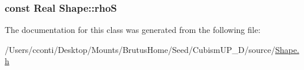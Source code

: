 \subsubsection[{rho\+S}]{\setlength{\rightskip}{0pt plus 5cm}const {\bf Real} Shape\+::rho\+S\hspace{0.3cm}{\ttfamily [protected]}}\label{class_shape_a181acdc3063f20a15ba1807f7b6a5d10}


The documentation for this class was generated from the following file\+:\begin{DoxyCompactItemize}
\item 
/\+Users/cconti/\+Desktop/\+Mounts/\+Brutus\+Home/\+Seed/\+Cubism\+U\+P\+\_\+D/source/\hyperlink{_shape_8h}{Shape.\+h}\end{DoxyCompactItemize}
